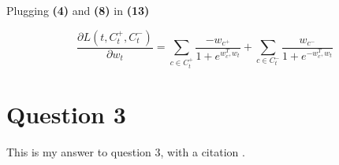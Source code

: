 \documentclass[a4paper]{article}
\begin{document}
Plugging \textbf{(4)} and \textbf{(8)} in \textbf{(13)}

\begin{equation}
\boxed{
\frac{\partial L(t, C_{t}^{+},C_{t}^{-})}{\partial w_{t}} =
\sum_{c \in C_{t}^{+}}
 \frac{-w_{c^{+}}}{1 + e^{w_{c^{+}}^{T}w_{t}}}
+
\sum_{c \in C_{t}^{-}}
 \frac{w_{c^{-}}}{1 + e^{-w_{c^{+}}^{T}w_{t}}}
 }
\end{equation}


\section{Question 3}

This is my answer to question 3, with a citation \cite{vaswani2017attention}. 



\end{document}
